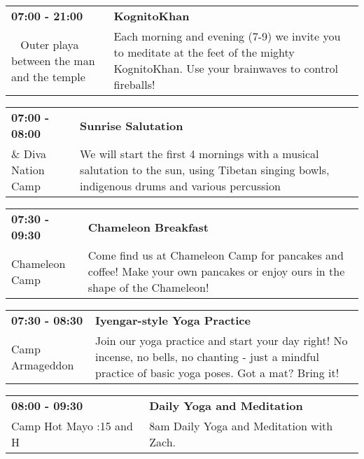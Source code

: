 \begin{tabular}{ p{1in} p{2.2in} }
    \textbf{07:00 - 21:00} & \textbf{KognitoKhan} \\
    ~ \newline Outer playa between the man and the temple & Each morning and evening (7-9) we invite you to meditate at the feet of the mighty KognitoKhan. Use your brainwaves to control fireballs! \\
    \hline 
\end{tabular}
    
\begin{tabular}{ p{1in} p{2.2in} }
    \textbf{07:00 - 08:00} & \textbf{Sunrise Salutation} \\
    \& \newline Diva Nation Camp & We will start the first 4 mornings with a musical salutation to the sun, using Tibetan singing bowls, indigenous drums and various percussion \\
    \hline 
\end{tabular}
    
\begin{tabular}{ p{1in} p{2.2in} }
    \textbf{07:30 - 09:30} & \textbf{Chameleon Breakfast} \\
    Chameleon Camp \newline  & Come find us at Chameleon Camp for pancakes and coffee! Make your own pancakes or enjoy ours in the shape of the Chameleon! \\
    \hline 
\end{tabular}
    
\begin{tabular}{ p{1in} p{2.2in} }
    \textbf{07:30 - 08:30} & \textbf{Iyengar-style Yoga Practice} \\
    Camp Armageddon \newline  & Join our yoga practice and start your day right! No incense, no bells, no chanting - just a mindful practice of basic yoga poses. Got a mat? Bring it! \\
    \hline 
\end{tabular}
    
\begin{tabular}{ p{1in} p{2.2in} }
    \textbf{08:00 - 09:30} & \textbf{Daily Yoga and Meditation} \\
    Camp Hot Mayo \newline 9:15 and H & 8am Daily Yoga and Meditation with Zach. \\
    \hline 
\end{tabular}
    
